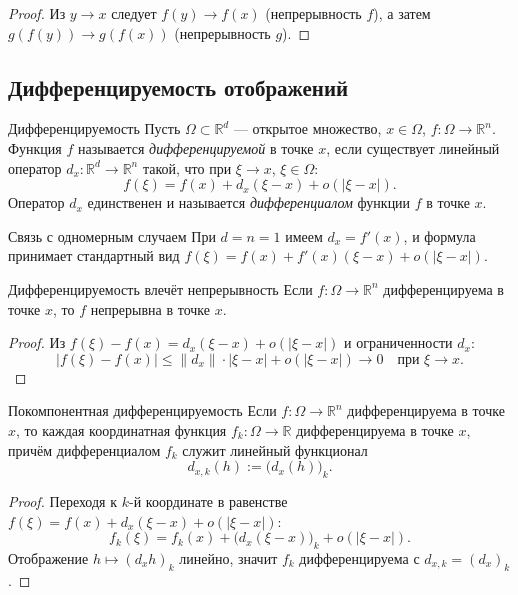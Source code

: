 \begin{proof}
	Из $y\to x$ следует $f(y)\to f(x)$ (непрерывность $f$), а затем $g(f(y))\to g(f(x))$ (непрерывность $g$).
\end{proof}

\subsection{Дифференцируемость отображений}

\begin{Definition}{Дифференцируемость}{}
	Пусть $\Omega\subset\mathbb{R}^d$ --- открытое множество, $x\in\Omega$, $f:\Omega\to\mathbb{R}^n$.
	Функция $f$ называется \emph{дифференцируемой} в точке $x$, если существует линейный оператор
	$d_x:\mathbb{R}^d\to\mathbb{R}^n$ такой, что при $\xi\to x$, $\xi\in\Omega$:
	\[
	f(\xi)=f(x)+d_x(\xi-x)+o(|\xi-x|).
	\]
	Оператор $d_x$ единственен и называется \emph{дифференциалом} функции $f$ в точке $x$.
\end{Definition}

\begin{Remark}{Связь с одномерным случаем}{}
	При $d=n=1$ имеем $d_x=f'(x)$, и формула принимает стандартный вид
	$f(\xi)=f(x)+f'(x)(\xi-x)+o(|\xi-x|)$.
\end{Remark}

\begin{Statement}{Дифференцируемость влечёт непрерывность}{}
	Если $f:\Omega\to\mathbb{R}^n$ дифференцируема в точке $x$, то $f$ непрерывна в точке $x$.
\end{Statement}

\begin{proof}
	Из $f(\xi)-f(x)=d_x(\xi-x)+o(|\xi-x|)$ и ограниченности $d_x$:
	\[
	|f(\xi)-f(x)|\le\|d_x\|\cdot|\xi-x|+o(|\xi-x|)\to0\quad\text{при }\xi\to x.
	\]
\end{proof}

\begin{Statement}{Покомпонентная дифференцируемость}{}
	Если $f:\Omega\to\mathbb{R}^n$ дифференцируема в точке $x$, то каждая координатная функция
	$f_k:\Omega\to\mathbb{R}$ дифференцируема в точке $x$, причём дифференциалом $f_k$ служит
	линейный функционал
	\[
	d_{x,k}(h):=\bigl(d_x(h)\bigr)_k.
	\]
\end{Statement}

\begin{proof}
	Переходя к $k$-й координате в равенстве
	$f(\xi)=f(x)+d_x(\xi-x)+o(|\xi-x|)$:
	\[
	f_k(\xi)=f_k(x)+\bigl(d_x(\xi-x)\bigr)_k+o(|\xi-x|).
	\]
	Отображение $h\mapsto(d_x h)_k$ линейно, значит $f_k$ дифференцируема с $d_{x,k}=(d_x)_k$.
\end{proof}

